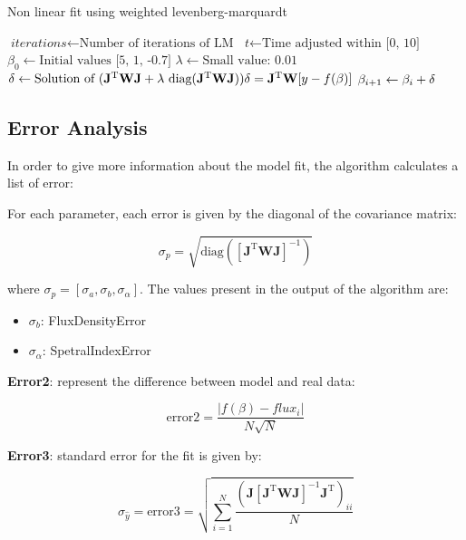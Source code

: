 \documentclass[10pt]{article}
\begin{document}
\begin{algorithm}[H]
\caption{Non linear fit using weighted levenberg-marquardt}\label{4months}
\begin{algorithmic}[1]
\State $\textit{iterations} \gets \text{Number of iterations of LM}$
\Statex
\State $\textit{t} \gets \text{Time adjusted within [0, 10]}$
\Statex
\State $\textit{$\beta_0$} \gets \text{Initial values [5, 1, -0.7]}$
\Statex
\State $\textit{$\lambda$} \gets \text{Small value: 0.01}$
\Statex
{}
\Statex
\State $\textit{$\delta$} \gets \text{Solution of $ (\mathbf{J}^{\text{T}}\mathbf{W}\mathbf{J} + \lambda~\text{diag}(\mathbf{J}^{\text{T}}\mathbf{W}\mathbf{J})) \delta = \mathbf{J}^{\text{T}}\mathbf{W}[y - f(\beta)] $}$
\Statex
\State $\textit{$\beta_{i+1}$} \gets \text{$ \beta_i + \delta $}$
\Statex
\EndFor
\State {}
\EndProcedure
\end{algorithmic}
\end{algorithm}

\subsection{Error Analysis}
In order to give more information about the model fit, the algorithm calculates a list of error:

For each parameter, each error is given by the diagonal of the covariance matrix:

$$ \sigma_p = \sqrt{\text{diag}([\mathbf{J}^{\text{T}}\mathbf{W}\mathbf{J}]^{-1})} $$

\noindent where $\sigma_p = [\sigma_a, \sigma_b, \sigma_{\alpha}]$. The values present in the output of the algorithm are:
\begin{itemize}
    \item $\sigma_b$: FluxDensityError 
    \item $\sigma_{\alpha}$: SpetralIndexError
\end{itemize}

\noindent \textbf{Error2}: represent the difference between model and real data:

$$ \text{error2} = \frac{|f(\beta) - flux_i|}{N\sqrt{N}}  $$

\noindent \textbf{Error3}: standard error for the fit is given by:

$$ \sigma_{\hat{y}} = \text{error3} = \sqrt{\sum_{i=1}^{N}\frac{(\mathbf{J}[\mathbf{J}^{\text{T}}\mathbf{W}\mathbf{J}]^{-1}\mathbf{J}^{\text{T}})_{ii}}{N}} $$
\end{document}
